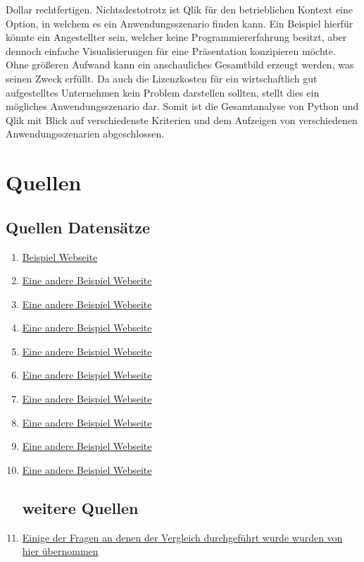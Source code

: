 \documentclass[12pt]{article}
\begin{document}
	Dollar rechtfertigen.
	Nichtsdestotrotz ist Qlik für den betrieblichen Kontext eine Option, in welchem es ein
	Anwendungsszenario finden kann.
	Ein Beispiel hierfür könnte ein Angestellter sein, welcher keine Programmiererfahrung
	besitzt, aber dennoch einfache Visualisierungen für eine Präsentation konzipieren
	möchte. Ohne größeren Aufwand kann ein anschauliches Gesamtbild erzeugt werden,
	was seinen Zweck erfüllt.
	Da auch die Lizenzkosten für ein wirtschaftlich gut aufgestelltes Unternehmen kein
	Problem darstellen sollten, stellt dies ein mögliches Anwendungsszenario dar.
	Somit ist die Gesamtanalyse von Python und Qlik mit Blick auf verschiedenste Kriterien
	und dem Aufzeigen von verschiedenen Anwendungsszenarien abgeschlossen.
	
	\section{Quellen}
	
	\subsection{Quellen Datensätze}
	
	\begin{enumerate}
		\item \href{https://example.com}{Beispiel Webseite}
		\item \href{https://example.org}{Eine andere Beispiel Webseite}
		\item \href{https://example.org}{Eine andere Beispiel Webseite}
		\item \href{https://example.org}{Eine andere Beispiel Webseite}
		\item \href{https://example.org}{Eine andere Beispiel Webseite}
		\item \href{https://example.org}{Eine andere Beispiel Webseite}
		\item \href{https://example.org}{Eine andere Beispiel Webseite}
		\item \href{https://example.org}{Eine andere Beispiel Webseite}
		\item \href{https://example.org}{Eine andere Beispiel Webseite}
		\item \href{https://example.org}{Eine andere Beispiel Webseite}
		
		\subsection{weitere Quellen}
		\item \href{https://www.gapminder.org/}{Einige der Fragen an denen der Vergleich durchgeführt wurde wurden von hier übernommen}
		
	\end{enumerate}
	
\end{document}
